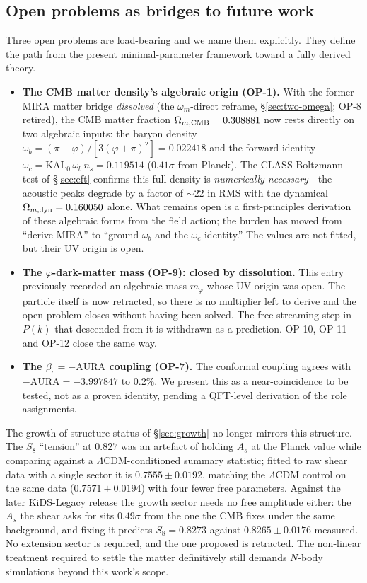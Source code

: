 \documentclass[a4paper,11pt]{article}
\begin{document}
\subsection{Open problems as bridges to future work}

Three open problems are load-bearing and we name them explicitly. They define
the path from the present minimal-parameter framework toward a fully derived
theory.

\begin{itemize}
\item \textbf{The CMB matter density's algebraic origin (OP-1).} With the
former MIRA matter bridge \emph{dissolved} (the $\omega_m$-direct reframe,
\S\ref{sec:two-omega}; OP-8 retired), the CMB matter fraction
$\Omega_{m,\rm CMB}=0.308881$ now rests directly on two algebraic inputs: the
baryon density $\omega_b=(\pi-\varphi)/[3(\varphi+\pi)^2]=0.022418$ and the forward
identity $\omega_c=\mathrm{KAL}_0\,\omega_b\,n_s=0.119514$ ($0.41\sigma$ from
Planck). The CLASS Boltzmann test of \S\ref{sec:eft} confirms this full density
is \emph{numerically necessary}---the acoustic peaks degrade by a factor of
$\sim22$ in RMS with the dynamical $\Omega_{m,\rm dyn}=0.160050$ alone. What remains
open is a first-principles derivation of these algebraic forms from the field
action; the burden has moved from ``derive MIRA'' to ``ground $\omega_b$ and the
$\omega_c$ identity.'' The values are not fitted, but their UV origin is open.

\item \textbf{The $\varphi$-dark-matter mass (OP-9): closed by dissolution.}
This entry previously recorded an algebraic mass $m_\varphi$ whose UV origin
was open. The particle itself is now retracted, so there is no multiplier left
to derive and the open problem closes without having been solved. The
free-streaming step in $P(k)$ that descended from it is withdrawn as a
prediction. OP-10, OP-11 and OP-12 close the same way.

\item \textbf{The $\beta_c=-\mathrm{AURA}$ coupling (OP-7).} The conformal
coupling agrees with $-\mathrm{AURA}=-3.997847$ to $0.2\%$. We present this as a
near-coincidence to be tested, not as a proven identity, pending a QFT-level
derivation of the role assignments.
\end{itemize}

The growth-of-structure status of \S\ref{sec:growth} no longer mirrors this
structure. The $S_8$ ``tension'' at $0.827$ was an artefact of holding $A_s$ at
the Planck value while comparing against a $\Lambda$CDM-conditioned summary
statistic; fitted to raw shear data with a single sector it is
$0.7555\pm0.0192$, matching the $\Lambda$CDM control on the same data ($0.7571\pm0.0194$) with four fewer free parameters. Against the later KiDS-Legacy release the growth sector needs no free amplitude either: the $A_s$ the shear asks for sits $0.49\sigma$ from the one the CMB fixes under the same background, and fixing it predicts $S_8=0.8273$ against $0.8265\pm0.0176$ measured. No extension sector is required, and the one
proposed is retracted. The non-linear treatment required to settle the matter
definitively still demands $N$-body simulations beyond this work's scope.
\end{document}
